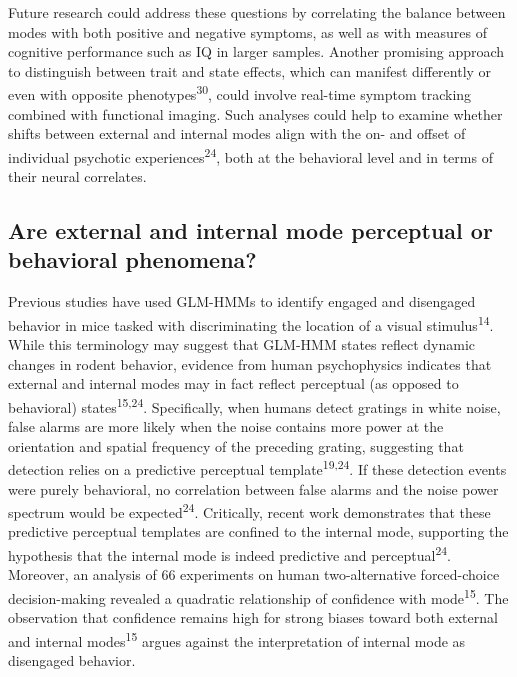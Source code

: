 \documentclass[
]{article}
\begin{document}
Future research could address these questions by correlating the balance
between modes with both positive and negative symptoms, as well as with
measures of cognitive performance such as IQ in larger samples. Another
promising approach to distinguish between trait and state effects, which
can manifest differently or even with opposite
phenotypes\textsuperscript{30}, could involve real-time symptom tracking
combined with functional imaging. Such analyses could help to examine
whether shifts between external and internal modes align with the on-
and offset of individual psychotic experiences\textsuperscript{24}, both
at the behavioral level and in terms of their neural correlates.

\subsection{Are external and internal mode perceptual or behavioral
phenomena?}\label{are-external-and-internal-mode-perceptual-or-behavioral-phenomena}

Previous studies have used GLM-HMMs to identify engaged and disengaged
behavior in mice tasked with discriminating the location of a visual
stimulus\textsuperscript{14}. While this terminology may suggest that
GLM-HMM states reflect dynamic changes in rodent behavior, evidence from
human psychophysics indicates that external and internal modes may in
fact reflect perceptual (as opposed to behavioral)
states\textsuperscript{15,24}. Specifically, when humans detect gratings
in white noise, false alarms are more likely when the noise contains
more power at the orientation and spatial frequency of the preceding
grating, suggesting that detection relies on a predictive perceptual
template\textsuperscript{19,24}. If these detection events were purely
behavioral, no correlation between false alarms and the noise power
spectrum would be expected\textsuperscript{24}. Critically, recent work
demonstrates that these predictive perceptual templates are confined to
the internal mode, supporting the hypothesis that the internal mode is
indeed predictive and perceptual\textsuperscript{24}. Moreover, an
analysis of 66 experiments on human two-alternative forced-choice
decision-making revealed a quadratic relationship of confidence with
mode\textsuperscript{15}. The observation that confidence remains high
for strong biases toward both external and internal
modes\textsuperscript{15} argues against the interpretation of internal
mode as disengaged behavior.
\end{document}
